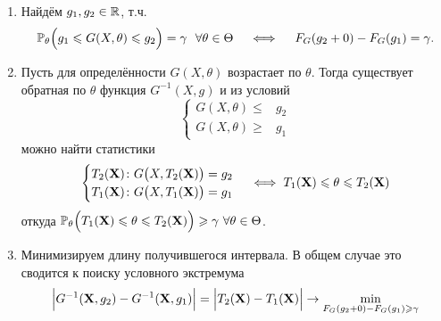 \begin{enumerate}
    \item Найдём $g_{1}, g_{2} \in \mathbb{R}$, т.ч.
        \begin{equation*}
            \operatorname{\operatorname{\mathbb{P}}_{\theta}}\Bigl(g_{1} \leqslant G(X, \theta) \leqslant g_{2}\Bigr)=\gamma~~\forall \theta \in \Theta \quad \iff \quad  F_{G}(g_{2} + 0) - F_{G}(g_{1})=\gamma.
        \end{equation*}
    \item Пусть для определённости $G(X,\theta)$ возрастает по $\theta$. 
        Тогда существует обратная по $\theta$ функция $G^{-1}(X, g)$ и из условий
        \begin{equation*}
            \begin{cases}
                G(X, \theta) \leqslant & g_{2} \\
                G(X, \theta) \geqslant & g_{1}
            \end{cases}
        \end{equation*}
        можно найти статистики
        \begin{equation*}
            \begin{cases}
                T_{2}(\mathbf{X})\colon G\bigl(X, T_{2}(\mathbf{X})\bigr) = g_{2} \\ 
                T_{1}(\mathbf{X})\colon G\bigl(X, T_{1}(\mathbf{X})\bigr) = g_{1}
            \end{cases}
            \iff T_{1}(\mathbf{X}) \leqslant \theta \leqslant T_{2}(\mathbf{X}) 
        \end{equation*}
        откуда $\operatorname{\operatorname{\mathbb{P}}_{\theta}}\Bigl(T_{1}(\mathbf{X}) \leqslant \theta \leqslant T_{2}(\mathbf{X})\Bigr) \geqslant \gamma~ \forall \theta \in \Theta$.
    \item 
        Минимизируем длину получившегося интервала.
        В общем случае это сводится к поиску условного экстремума
        \begin{equation*}
            \Bigl| G^{-1}(\mathbf{X}, g_2) - G^{-1}(\mathbf{X}, g_1) \Bigr| = 
            \Bigl| T_2(\mathbf{X}) - T_1(\mathbf{X}) \Bigr| \to 
            \min_{F_{G}(g_2 + 0) - F_{G}(g_1) \geqslant \gamma}
        \end{equation*}
\end{enumerate}


